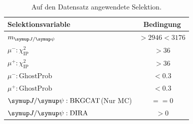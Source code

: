 \begin{table}[htb]
  \centering
  \caption{Auf den Datensatz angewendete Selektion.}
  \begin{tabular}{lc}
    \toprule
    Selektionsvariable                & Bedingung      \\
    \midrule
    $m_{\jpsi}$                       & $>\num{2946}<\num{3176}$  \\
    $\mu^{-}:\chi_{\text{IP}}^2$      & $>\num{36}$  \\
    $\mu^{+}:\chi_{\text{IP}}^2$      & $>\num{36}$  \\
    $\mu^{-}:\text{GhostProb}$        & $<\num{0.3}$ \\
    $\mu^{+}:\text{GhostProb}$        & $<\num{0.3}$ \\
    $\jpsi:\text{BKGCAT}$(Nur MC)     & $==\num{0}$  \\
    $\jpsi:\text{DIRA}$               & $>\num{0}$  \\
    \bottomrule
  \end{tabular}
  \label{tab:strip}
\end{table}

